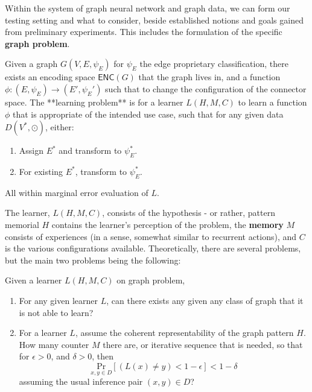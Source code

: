 \documentclass[twoside,10pt]{article}
\begin{document}
Within the system of graph neural network and graph data, we can form our testing setting and what to consider, beside established notions and goals gained from preliminary experiments. This includes the formulation of the specific \textbf{graph problem}. 
\begin{definition}
  Given a graph $G(V,E,\psi_{E})$ for $\psi_{E}$ the edge proprietary classification, there exists an encoding space $\mathsf{ENC}(G)$ that the graph lives in, and a function $\phi: (E,\psi_{E})\to (E',\psi_{E}')$ such that to change the configuration of the connector space. The **learning problem** is for a learner $L(H,M,C)$ to learn a function $\phi$ that is appropriate of the intended use case, such that for any given data $D(V^{*},\odot)$, either:
  \begin{enumerate}
    \item Assign $E^{*}$ and transform to $\psi_{E}^{*}$. 
    \item For existing $E^{*}$, transform to $\psi^{*}_{E}$. 
  \end{enumerate}
  All within marginal error evaluation of $L$. 
\end{definition}

The learner, $L(H,M,C)$, consists of the hypothesis - or rather, pattern memorial $H$ contains the learner's perception of the problem, the \textbf{memory} $M$ consists of experiences (in a sense, somewhat similar to recurrent actions), and $C$ is the various configurations available. Theoretically, there are several problems, but the main two problems being the following: 

\begin{question}
  Given a learner $L(H,M,C)$ on graph problem, 
  \begin{enumerate}[topsep=0pt,itemsep=0.5pt]
    \item For any given learner $L$, can there exists any given any class of graph that it is not able to learn?
    \item For a learner $L$, assume the coherent representability of the graph pattern $H$. How many counter $M$ there are, or iterative sequence that is needed, so that for $\epsilon>0$, and $\delta>0$, then $$\underset{x,y\in D}{\mathrm{Pr}}[(L(x)\neq y)<1-\epsilon]< 1-\delta$$ assuming the usual inference pair $(x,y)\in D$?
  \end{enumerate}
\end{question}


\clearpage
\end{document}
